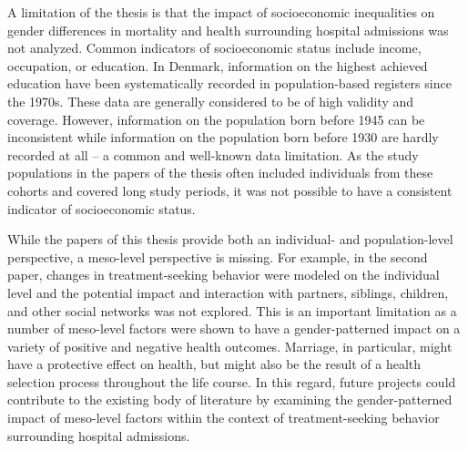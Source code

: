 A limitation of the thesis is that the impact of socioeconomic inequalities 
on gender differences in mortality and health surrounding hospital admissions 
was not analyzed. Common indicators of socioeconomic status include income, 
occupation, or education.\citep{naess2005four,galobardes2007measuring} In 
Denmark, information on the highest achieved education 
have been systematically recorded in population-based registers since 
the 1970s.\citep{jensen2011danish} These data are generally considered 
to be of high validity and coverage.\citep{pallesen2010data,jensen2011danish,
thygesen2011} However, information on the population born before 1945 
can be inconsistent while information on the population born 
before 1930 are hardly recorded at all -- a common and well-known data 
limitation.\citep{koch2015association,bronnum2017socially} As the 
study populations in the papers of the thesis often included individuals 
from these cohorts and covered long study periods, it was not possible to 
have a consistent indicator of socioeconomic status. 

While the papers of this thesis provide both an individual- and 
population-level perspective, a meso-level perspective is missing. 
For example, in the second paper, changes in treatment-seeking behavior 
were modeled on the individual level and the potential impact and 
interaction with partners, siblings, children, and other social networks 
was not explored. This is an important limitation as a number of meso-level 
factors were shown to have a gender-patterned impact on a variety of 
positive and negative health outcomes.\citep{martikainen2002psychosocial,
avlund2004social,lund2010can} Marriage, in particular, might have a 
protective effect on health, but might also be the result of a health 
selection process throughout the life course.\citep{mastekaasa1992marriage,
goldman1993marriage,waldron1996marriage,manzoli2007marital} In this 
regard, future projects could contribute to the existing body of literature 
by examining the gender-patterned impact of meso-level factors within 
the context of treatment-seeking behavior surrounding hospital admissions. 

